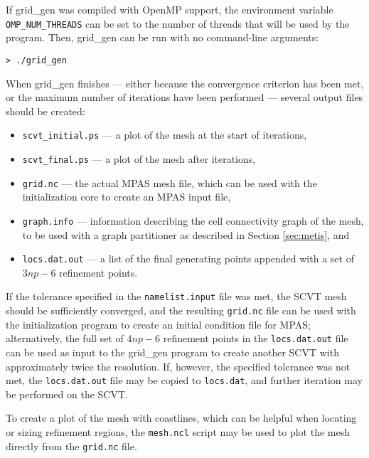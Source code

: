 If grid\_gen was compiled with OpenMP support, the environment variable {\tt OMP\_NUM\_THREADS} can be set to the 
number of threads that will be used by the program. Then, grid\_gen can be run with no command-line arguments:

\vspace{12pt}
{\tt > ./grid\_gen}
\vspace{12pt}
                                                                                         
                                                                                                
When grid\_gen finishes --- either because the convergence criterion has been met, or the
maximum number of iterations have been performed ---  several output files should be created: 

\begin{itemize}
\item {\tt scvt\_initial.ps} --- a plot of the mesh at the start of iterations,
\item {\tt scvt\_final.ps} --- a plot of the mesh after iterations,
\item {\tt grid.nc} --- the actual MPAS mesh file, which can be used with the initialization core to create an MPAS input file,
\item {\tt graph.info} --- information describing the cell connectivity graph of the mesh, to be used with a graph partitioner as described in Section \ref{sec:metis}, and
\item {\tt locs.dat.out} --- a list of the final generating points appended with a set of $3 np - 6$ refinement points. 
\end{itemize}

If the tolerance specified in the {\tt namelist.input} file was met, the SCVT mesh should be sufficiently converged, and the resulting {\tt grid.nc}
file can be used with the initialization program to create an initial condition file for MPAS; alternatively, the full set of $4 np - 6$ refinement points in 
the {\tt locs.dat.out} file can be used as input to the grid\_gen program to create another SCVT with approximately twice the resolution. If, however, the specified tolerance was not met, the {\tt locs.dat.out} file may be copied to {\tt locs.dat}, and further iteration may be performed on the SCVT.

To create a plot of the mesh with coastlines, which can be helpful when locating or sizing refinement regions, the {\tt mesh.ncl} script may be used to plot the mesh directly from                 
the {\tt grid.nc} file.                                                                          

